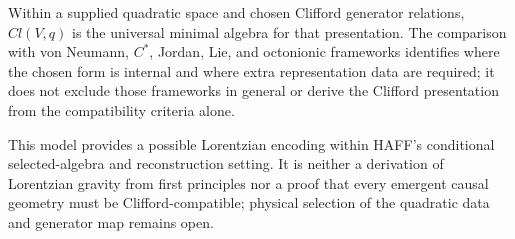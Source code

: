 \documentclass[12pt]{article}
\begin{document}
Within a supplied quadratic space and chosen Clifford generator relations, $Cl(V,q)$ is the universal minimal algebra for that presentation.
The comparison with von Neumann, $C^*$, Jordan, Lie, and octonionic frameworks identifies where the chosen form is internal and where extra representation data are required; it does not exclude those frameworks in general or derive the Clifford presentation from the compatibility criteria alone.

This model provides a possible Lorentzian encoding within HAFF's conditional selected-algebra and reconstruction setting.
It is neither a derivation of Lorentzian gravity from first principles nor a proof that every emergent causal geometry must be Clifford-compatible; physical selection of the quadratic data and generator map remains open.

\end{document}
